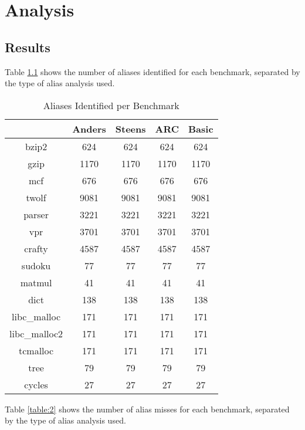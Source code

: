 \chapter{Analysis}

\section{Results}
Table \ref{table:1} shows the number of aliases identified for each benchmark, separated by the type of alias analysis used.

\begin{table} [h!]
\centering
   \begin{tabular} {|c|c c c c|}
      \hline
      & Anders & Steens & ARC & Basic \\
      \hline
	   bzip2 & 624 & 624 & 624 & 624 \\
      \hline
	   gzip & 1170 & 1170 & 1170 & 1170 \\
      \hline
           mcf & 676 & 676 & 676 & 676 \\
      \hline
	   twolf & 9081 & 9081 & 9081 & 9081 \\
      \hline
	   parser & 3221 & 3221 & 3221 & 3221 \\
      \hline
	   vpr & 3701 & 3701 & 3701 & 3701 \\
      \hline
	   crafty & 4587 & 4587 & 4587 & 4587 \\
      \hline
	   sudoku & 77 & 77 & 77 & 77 \\
      \hline
	   matmul & 41 & 41 & 41 & 41 \\
      \hline
	   dict & 138 & 138 & 138 & 138 \\
      \hline
	   libc\_malloc & 171 & 171 & 171 & 171 \\
      \hline
	   libc\_malloc2 & 171 & 171 & 171 & 171 \\
      \hline
	   tcmalloc & 171 & 171 & 171 & 171 \\
      \hline
	   tree & 79 & 79 & 79 & 79 \\
      \hline
	   cycles & 27 & 27 & 27 & 27 \\
      \hline
   \end{tabular}
   \caption{Aliases Identified per Benchmark}
   \label{table:1}
\end{table}

\newpage

Table \ref{table:2} shows the number of alias misses for each benchmark, separated by the type of alias analysis used.


